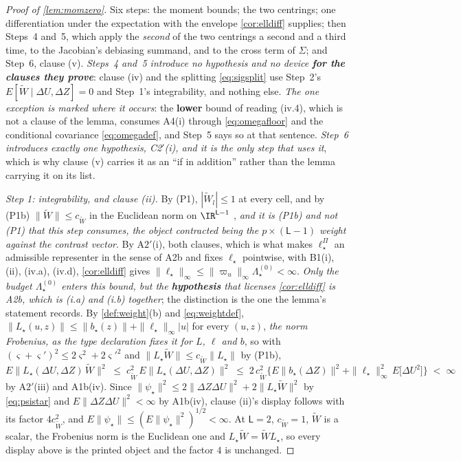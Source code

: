 \begin{proof}[Proof of \cref{lem:momzero}]
Six steps: the moment bounds; the two centrings; one differentiation under the expectation with the
envelope \cref{cor:elldiff} supplies; then Steps~4 and~5, which apply the \emph{second} of the two
centrings a second and a third time, to the Jacobian's debiasing summand, and to the cross term of
$\Sigma$; and Step~6, clause \textup{(v)}. \emph{Steps~4 and~5 introduce no hypothesis and no device
\textbf{for the clauses they prove}}: clause \textup{(iv)} and the splitting \eqref{eq:sigsplit} use
Step~2's $E[\widetilde W\mid\Delta U,\Delta Z]=0$ and Step~1's integrability, and nothing else.
\emph{The one exception is marked where it occurs}: the \textbf{lower} bound of reading
\textup{(iv.4)}, which is not a clause of the lemma, consumes A4(i) through
\eqref{eq:omegafloor} and the conditional covariance \eqref{eq:omegadef}, and Step~5 says so at that
sentence.
\emph{Step~6 introduces exactly one hypothesis, C2$'$(i), and it is the only step that uses it}, which is
why clause \textup{(v)} carries it as an ``if in addition'' rather than the lemma carrying it on its list.

\emph{Step 1: integrability, and clause \textup{(ii)}.} By (P1), $|\widetilde W_l|\le1$ at every cell, and
by \textup{(P1b)} $\|\widetilde W\|\le c_{\widetilde W}$ in the Euclidean norm on $\IR^{\mathsf L-1}$
, \emph{and it is \textup{(P1b)} and not \textup{(P1)} that this step consumes, the object contracted
being the $p\times(\mathsf L-1)$ weight against the contrast vector}. By A$2'$(i), both
clauses, which is what makes $\ell^\Pi_\star$ an admissible representer in the sense of A2b and fixes
$\ell_\star$ pointwise, with B1(i), (ii), (iv.a), (iv.d), \cref{cor:elldiff} gives
$\|\ell_\star\|_\infty\le\|\varpi_u\|_\infty\Lambda^{(0)}_\star<\infty$. \emph{Only the budget
$\Lambda^{(0)}_\star$ enters this bound, but the \textbf{hypothesis} that licenses \cref{cor:elldiff} is
A2b, which is (i.a) and (i.b) together}; the distinction is the one the lemma's statement records. By
\cref{def:weight}(b) and
\eqref{eq:weightdef}, $\|L_\star(u,z)\|\le\|b_\star(z)\|+\|\ell_\star\|_\infty|u|$ for every $(u,z)$, 
\emph{the norm Frobenius, as the type declaration fixes it for $L$, $\ell$ and $b$}, so with
$(\varsigma+\varsigma')^{2}\le2\varsigma^{2}+2\varsigma'^{2}$ and
$\|L_\star\widetilde W\|\le c_{\widetilde W}\|L_\star\|$ by \textup{(P1b)},
\[
E\big\|L_\star(\Delta U,\Delta Z)\,\widetilde W\big\|^{2}
\;\le\;c_{\widetilde W}^{2}\,E\big\|L_\star(\Delta U,\Delta Z)\big\|^{2}
\;\le\;2\,c_{\widetilde W}^{2}\Big\{E\big\|b_\star(\Delta Z)\big\|^{2}+\|\ell_\star\|^{2}_\infty\,E\big[\Delta U^{2}\big]\Big\}\;<\;\infty
\]
by A$2'$(iii) and A1b(iv). Since $\|\psi_\star\|^{2}\le2\|\Delta Z\Delta U\|^{2}+2\|L_\star\widetilde W\|^{2}$
by \eqref{eq:psistar} and $E\|\Delta Z\Delta U\|^{2}<\infty$ by A1b(iv), clause (ii)'s display follows
with its factor $4c_{\widetilde W}^{2}$, and
$E\|\psi_\star\|\le(E\|\psi_\star\|^{2})^{1/2}<\infty$. At $\mathsf L=2$, $c_{\widetilde W}=1$,
$\widetilde W$ is a scalar, the Frobenius norm is the Euclidean one and
$L_\star\widetilde W=\widetilde WL_\star$, so every display above is the printed object and the factor
$4$ is unchanged.


\end{proof}
